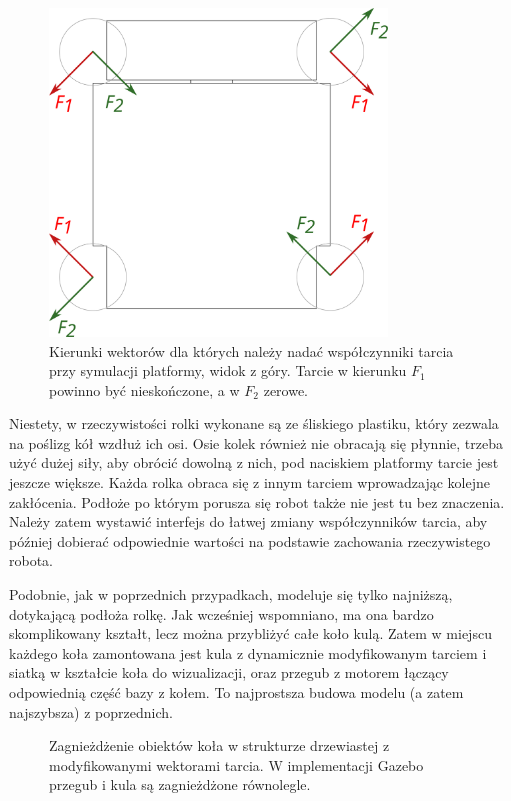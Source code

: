 		\begin{figure}[H]
		\centering
		\includegraphics[width=0.8\textwidth]{graphics/base_vects.pdf}
		\caption{Kierunki wektorów dla których należy nadać współczynniki tarcia przy symulacji platformy, widok z góry. Tarcie w kierunku $F_1$ powinno być nieskończone, a w $F_2$ zerowe.}
		\end{figure} 

		Niestety, w rzeczywistości rolki wykonane są ze śliskiego plastiku, który zezwala na poślizg kół wzdłuż ich osi.
		Osie kolek również nie obracają się płynnie, trzeba użyć dużej siły, aby obrócić dowolną z nich, pod naciskiem platformy tarcie jest jeszcze większe.
		Każda rolka obraca się z innym tarciem wprowadzając kolejne zakłócenia.
		Podłoże po którym porusza się robot także nie jest tu bez znaczenia.
		Należy zatem wystawić interfejs do łatwej zmiany współczynników tarcia, aby później dobierać odpowiednie wartości na podstawie zachowania rzeczywistego robota.

		Podobnie, jak w poprzednich przypadkach, modeluje się tylko najniższą, dotykającą podłoża rolkę.
		Jak wcześniej wspomniano, ma ona bardzo skomplikowany kształt, lecz można przybliżyć całe koło kulą.
		Zatem w miejscu każdego koła zamontowana jest kula z dynamicznie modyfikowanym tarciem i siatką w kształcie koła do wizualizacji, 
		oraz przegub z motorem łączący odpowiednią część bazy z kołem.
		To najprostsza budowa modelu (a zatem najszybsza) z poprzednich.
		
		\begin{figure}[H]
		\caption{Zagnieżdżenie obiektów koła w strukturze drzewiastej z modyfikowanymi wektorami tarcia. W implementacji Gazebo przegub i kula są zagnieżdżone równolegle.}
		\label{fig:omnivelma_wheel}
		\end{figure}

